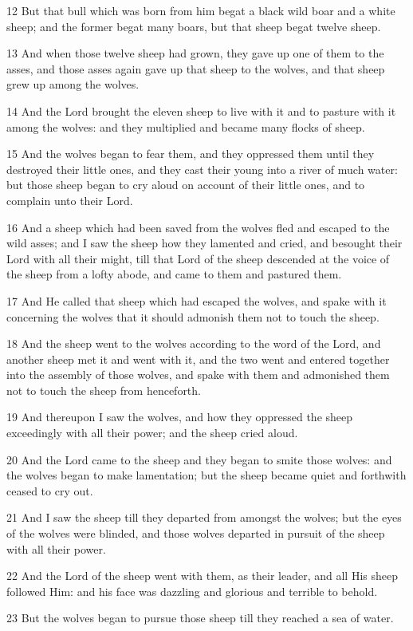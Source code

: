 \par 12 But that bull which was born from him begat a black wild boar and a white sheep; and the former begat many boars, but that sheep begat twelve sheep.
\par 13 And when those twelve sheep had grown, they gave up one of them to the asses, and those asses again gave up that sheep to the wolves, and that sheep grew up among the wolves.
\par 14 And the Lord brought the eleven sheep to live with it and to pasture with it among the wolves: and they multiplied and became many flocks of sheep.
\par 15 And the wolves began to fear them, and they oppressed them until they destroyed their little ones, and they cast their young into a river of much water: but those sheep began to cry aloud on account of their little ones, and to complain unto their Lord.
\par 16 And a sheep which had been saved from the wolves fled and escaped to the wild asses; and I saw the sheep how they lamented and cried, and besought their Lord with all their might, till that Lord of the sheep descended at the voice of the sheep from a lofty abode, and came to them and pastured them.
\par 17 And He called that sheep which had escaped the wolves, and spake with it concerning the wolves that it should admonish them not to touch the sheep.
\par 18 And the sheep went to the wolves according to the word of the Lord, and another sheep met it and went with it, and the two went and entered together into the assembly of those wolves, and spake with them and admonished them not to touch the sheep from henceforth.
\par 19 And thereupon I saw the wolves, and how they oppressed the sheep exceedingly with all their power; and the sheep cried aloud.
\par 20 And the Lord came to the sheep and they began to smite those wolves: and the wolves began to make lamentation; but the sheep became quiet and forthwith ceased to cry out.
\par 21 And I saw the sheep till they departed from amongst the wolves; but the eyes of the wolves were blinded, and those wolves departed in pursuit of the sheep with all their power.
\par 22 And the Lord of the sheep went with them, as their leader, and all His sheep followed Him: and his face was dazzling and glorious and terrible to behold.
\par 23 But the wolves began to pursue those sheep till they reached a sea of water.
